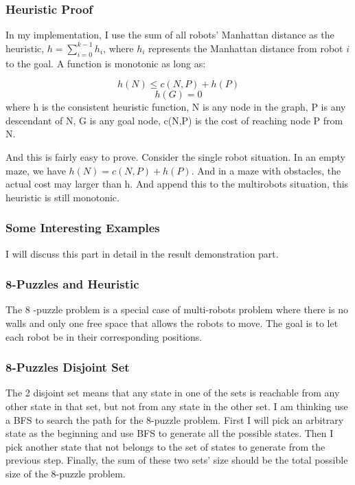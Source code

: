 \documentclass{article}
\begin{document}
\subsubsection{Heuristic Proof}
\begin{flushleft}
In my implementation, I use the sum of all robots' Manhattan distance as the heuristic,
$h = \sum^{k-1}_{i=0}h_i$, where $h_i$ represents the Manhattan distance from robot $i$ to the goal. A function is monotonic as long as:

$$h(N) \leq c(N,P)+h(P) $$
$$h(G)=0$$
where h is the consistent heuristic function, N is any node in the graph, P is any descendant of N, G is any goal node,  c(N,P) is the cost of reaching node P from N.

And this is fairly easy to prove. Consider the single robot situation. In an empty maze, we have $h(N) = c(N,P)+h(P) $. And in a maze with obstacles, the actual cost may larger than h. And append this to the multirobots situation, this heuristic is still monotonic.
\end{flushleft}

\subsubsection{Some Interesting Examples}
I will discuss this part in detail in the result demonstration part.

\subsubsection{8-Puzzles and Heuristic}
The 8 -puzzle problem is a special case of multi-robots problem where there is no walls and only one free space that allows the robots to move. The goal is to let each robot be in their corresponding positions.

\subsubsection{8-Puzzles Disjoint Set}
The 2 disjoint set means that any state in one of the sets is reachable from any other state in that set, but not from any state in the other set. I am thinking use a BFS to search the path for the 8-puzzle problem. First I will pick an arbitrary state as the beginning and use BFS to generate all the possible states. Then I pick another state that not belongs to the set of states to generate from the previous step. Finally, the sum of these two sets' size should be the total possible size of the 8-puzzle problem.
\end{document}
